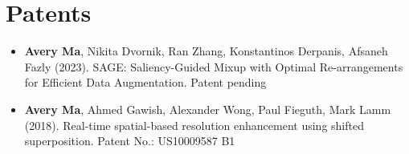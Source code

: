 \section*{Patents}
    \vspace{\postsubhead}
    \begin{adjustwidth}{\indentleft}{\indentright}
    \begin{itemize}
        \item \textbf{Avery Ma}, Nikita Dvornik, Ran Zhang, Konstantinos Derpanis, Afsaneh Fazly (2023). SAGE: Saliency-Guided Mixup with Optimal Re-arrangements for Efficient Data Augmentation. Patent pending
        \item \textbf{Avery Ma}, Ahmed Gawish, Alexander Wong, Paul Fieguth, Mark Lamm (2018). Real-time spatial-based resolution enhancement using shifted superposition. Patent No.: US10009587 B1
      \end{itemize}
    \end{adjustwidth}
    \vspace{\postsection}